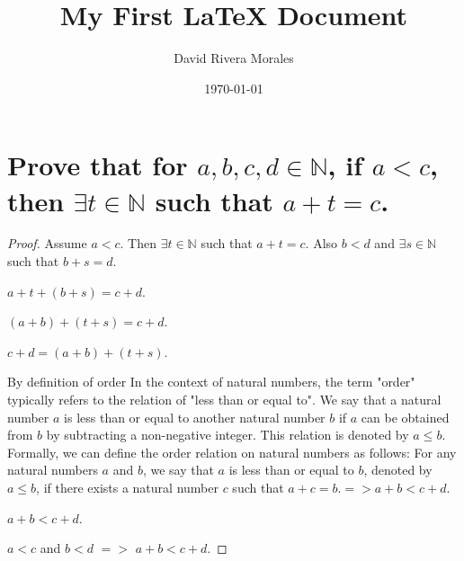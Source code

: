 \documentclass{article}
\begin{document}
\title{My First LaTeX Document}
\author{David Rivera Morales}
\date{\today}
\maketitle

\section{Prove that for $a,b,c,d \in \mathbb{N}$, if $a < c$, then $\exists t \in \mathbb{N}$ such that $a + t = c$.}

\begin{proof}
Assume $a < c$. Then $\exists t \in \mathbb{N}$ such that $a + t = c$. Also $b < d$ and $\exists s \in \mathbb{N}$ such that $b + s = d$.
\item $a + t + (b + s) = c + d$.
\item $(a + b) + (t + s) = c + d$.
\item $c + d = (a + b) + (t + s)$.
\item By definition of order 
In the context of natural numbers, the term "order" typically refers to the relation of "less than or equal to". We say that a natural number $a$ is less than or equal to another natural number $b$ if $a$ can be obtained from $b$ by subtracting a non-negative integer. This relation is denoted by $a \leq b$. 
Formally, we can define the order relation on natural numbers as follows:
For any natural numbers $a$ and $b$, we say that $a$ is less than or equal to $b$, denoted by $a \leq b$, if there exists a natural number $c$ such that $a + c = b$.$=> a + b < c + d$.
\item $a + b < c + d$.

\item $a < c$ and $b < d$ $=>$ $a + b < c + d$.

\end{proof}
\end{document}
